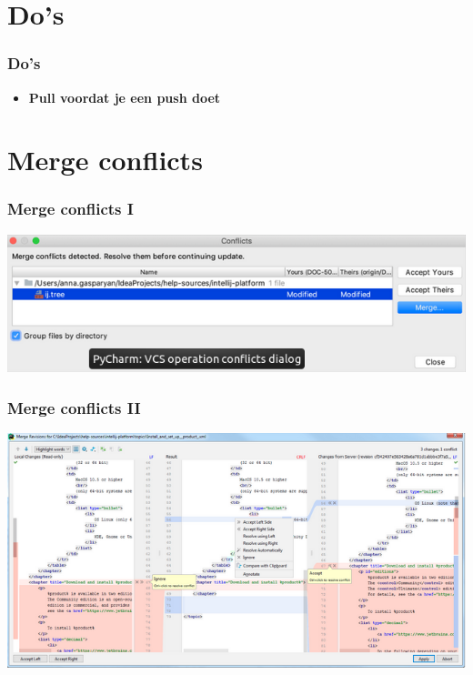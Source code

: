 	\section{Do's}
    \begin{frame} 
		\frametitle{Do's}
		\begin{itemize}
			\item \textbf{Pull voordat je een push doet}
		\end{itemize}
	\end{frame}
	
	\section{Merge conflicts}
	\begin{frame}
		\frametitle{Merge conflicts I}
		\includegraphics[scale=0.5]{res/mergeconflict1.png}
		
		
	\end{frame}
	\begin{frame}
		\frametitle{Merge conflicts II}
		\includegraphics[scale=0.45]{res/mergeconflict2.png}
	\end{frame}
	
	
	
	


